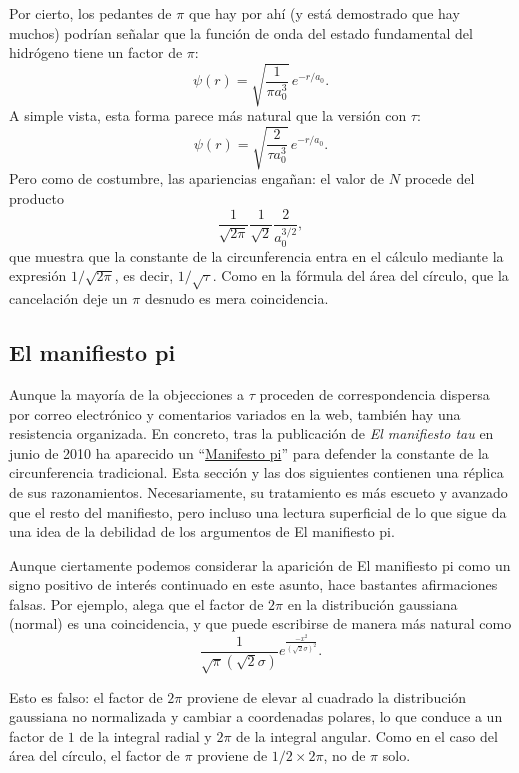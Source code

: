 Por cierto, los pedantes de $\pi$ que hay por ahí (y está demostrado que hay muchos) podrían señalar que la función de onda del estado fundamental del hidrógeno tiene un factor de $\pi$:
\[
\psi(r) = \sqrt{\frac{1}{\pi a_0^3}}\,e^{-r/a_0}.
\]
A simple vista, esta forma parece más natural que la versión con $\tau$:
\[
\psi(r) = \sqrt{\frac{2}{\tau a_0^3}}\,e^{-r/a_0}.
\]
Pero como de costumbre, las apariencias engañan: el valor de $N$ procede del producto
\[
\frac{1}{\sqrt{2\pi}} \frac{1}{\sqrt{2}} \frac{2}{a_0^{3/2}},
\]
que muestra que la constante de la circunferencia entra en el cálculo mediante la expresión $1/\sqrt{2\pi}$, es decir, $1/\sqrt{\tau}$. Como en la fórmula del área del círculo, que la cancelación deje un $\pi$ desnudo es mera coincidencia.



  \subsection{El manifiesto pi} %
  \label{sec:the_pi_manifesto_a_rebuttal}

Aunque la mayoría de la objecciones a $\tau$ proceden de correspondencia dispersa por correo electrónico y comentarios variados en la web, también hay una resistencia organizada. En concreto, tras la publicación de \emph{El manifiesto tau} en junio de 2010 ha aparecido un ``\href{http://www.thepimanifesto.com/}{Manifesto pi}'' para defender la constante de la circunferencia tradicional. Esta sección y las dos siguientes contienen una réplica de sus razonamientos. Necesariamente, su tratamiento es más escueto y avanzado que el resto del manifiesto, pero incluso una lectura superficial de lo que sigue da una idea de la debilidad de los argumentos de El manifiesto pi.

Aunque ciertamente podemos considerar la aparición de El manifiesto pi como un signo positivo de interés continuado en este asunto, hace bastantes afirmaciones falsas. Por ejemplo, alega que el factor de $2\pi$ en la distribución gaussiana (normal) es una coincidencia, y que puede escribirse de manera más natural como
\[
\frac{1}{\sqrt\pi(\sqrt 2\sigma)}e^{\frac{-x^2}{(\sqrt 2\sigma)^2}}.
\]

Esto es falso: el factor de $2\pi$ proviene de elevar al cuadrado la distribución gaussiana no normalizada y cambiar a coordenadas polares, lo que conduce a un factor de $1$ de la integral radial y  $2\pi$ de la integral angular. Como en el caso del área del círculo, el factor de $\pi$ proviene de $1/2\times 2\pi$, no de $\pi$ solo.

